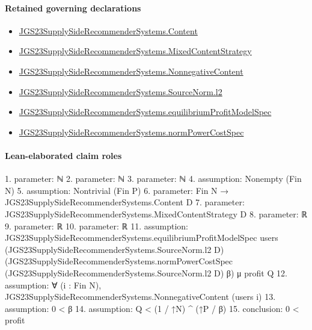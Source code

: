 \documentclass[10pt]{article}
\begin{document}
\paragraph{Retained governing declarations}
\begin{itemize}\raggedright
\item \hyperlink{governing-declaration-367305fda50f0ada}{JGS23\allowbreak{}Supply\allowbreak{}Side\allowbreak{}Recommender\allowbreak{}Systems.\allowbreak{}Content}
\item \hyperlink{governing-declaration-2089965d06cf0282}{JGS23\allowbreak{}Supply\allowbreak{}Side\allowbreak{}Recommender\allowbreak{}Systems.\allowbreak{}Mixed\allowbreak{}Content\allowbreak{}Strategy}
\item \hyperlink{governing-declaration-d426babe40b9593c}{JGS23\allowbreak{}Supply\allowbreak{}Side\allowbreak{}Recommender\allowbreak{}Systems.\allowbreak{}Nonnegative\allowbreak{}Content}
\item \hyperlink{governing-declaration-9299663ffe3ecb38}{JGS23\allowbreak{}Supply\allowbreak{}Side\allowbreak{}Recommender\allowbreak{}Systems.\allowbreak{}Source\allowbreak{}Norm.\allowbreak{}l2}
\item \hyperlink{paper-prerequisite-b22f75a76a22c218}{JGS23\allowbreak{}Supply\allowbreak{}Side\allowbreak{}Recommender\allowbreak{}Systems.\allowbreak{}equilibrium\allowbreak{}Profit\allowbreak{}Model\allowbreak{}Spec}
\item \hyperlink{governing-declaration-6ba13dc1cae95e6e}{JGS23\allowbreak{}Supply\allowbreak{}Side\allowbreak{}Recommender\allowbreak{}Systems.\allowbreak{}norm\allowbreak{}Power\allowbreak{}Cost\allowbreak{}Spec}
\end{itemize}
\paragraph{Lean-elaborated claim roles}\begin{ReviewVerbatim}
1. parameter: ℕ
2. parameter: ℕ
3. parameter: ℕ
4. assumption: Nonempty (Fin N)
5. assumption: Nontrivial (Fin P)
6. parameter: Fin N → JGS23SupplySideRecommenderSystems.Content D
7. parameter: JGS23SupplySideRecommenderSystems.MixedContentStrategy D
8. parameter: ℝ
9. parameter: ℝ
10. parameter: ℝ
11. assumption: JGS23SupplySideRecommenderSystems.equilibriumProfitModelSpec users (JGS23SupplySideRecommenderSystems.SourceNorm.l2 D)
  (JGS23SupplySideRecommenderSystems.normPowerCostSpec (JGS23SupplySideRecommenderSystems.SourceNorm.l2 D) β) μ profit Q
12. assumption: ∀ (i : Fin N), JGS23SupplySideRecommenderSystems.NonnegativeContent (users i)
13. assumption: 0 < β
14. assumption: Q < (1 / ↑N) ^ (↑P / β)
15. conclusion: 0 < profit
\end{ReviewVerbatim}
\end{document}
